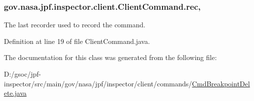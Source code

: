 \subsubsection[{\texorpdfstring{rec}{rec}}]{ gov.\+nasa.\+jpf.\+inspector.\+client.\+Client\+Command.\+rec\hspace{0.3cm}{\ttfamily [protected]}, {\ttfamily [inherited]}}\hypertarget{classgov_1_1nasa_1_1jpf_1_1inspector_1_1client_1_1_client_command_af4246f2427035c72a6af45a2c61361f7}{}\label{classgov_1_1nasa_1_1jpf_1_1inspector_1_1client_1_1_client_command_af4246f2427035c72a6af45a2c61361f7}


The last recorder used to record the command. 



Definition at line 19 of file Client\+Command.\+java.



The documentation for this class was generated from the following file\+:\begin{DoxyCompactItemize}
\item 
D\+:/gsoc/jpf-\/inspector/src/main/gov/nasa/jpf/inspector/client/commands/\hyperlink{_cmd_breakpoint_delete_8java}{Cmd\+Breakpoint\+Delete.\+java}\end{DoxyCompactItemize}
